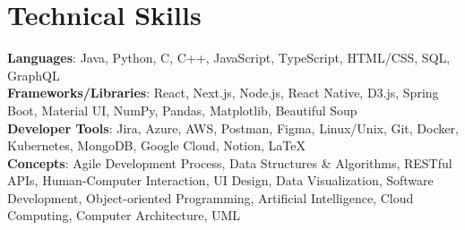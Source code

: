\documentclass[letterpaper,10pt]{article}
\begin{document}
%
\section{Technical Skills}
\begin{itemize}[leftmargin=0.15in, label={}]
    \small{\item{
        \textbf{Languages}{: Java, Python, C, C++, JavaScript, TypeScript, HTML/CSS, SQL, GraphQL} \\
        \textbf{Frameworks/Libraries}{: React, Next.js, Node.js, React Native, D3.js, Spring Boot, Material UI, NumPy, Pandas, Matplotlib, Beautiful Soup} \\
        \textbf{Developer Tools}{: Jira, Azure, AWS, Postman, Figma, Linux/Unix, Git, Docker, Kubernetes, MongoDB, Google Cloud, Notion, LaTeX} \\
        \textbf{Concepts}{: Agile Development Process, Data Structures \& Algorithms, RESTful APIs, Human-Computer Interaction, UI Design, Data Visualization, Software Development, Object-oriented Programming, Artificial Intelligence, Cloud Computing, Computer Architecture, UML}}}
\end{itemize}



\end{document}

